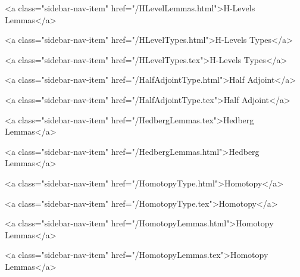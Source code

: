       
        
          <a class="sidebar-nav-item" href="/HLevelLemmas.html">H-Levels Lemmas</a>
        
      
    
      
        
          <a class="sidebar-nav-item" href="/HLevelTypes.html">H-Levels Types</a>
        
      
    
      
        
          <a class="sidebar-nav-item" href="/HLevelTypes.tex">H-Levels Types</a>
        
      
    
      
        
          <a class="sidebar-nav-item" href="/HalfAdjointType.html">Half Adjoint</a>
        
      
    
      
        
          <a class="sidebar-nav-item" href="/HalfAdjointType.tex">Half Adjoint</a>
        
      
    
      
        
          <a class="sidebar-nav-item" href="/HedbergLemmas.tex">Hedberg Lemmas</a>
        
      
    
      
        
          <a class="sidebar-nav-item" href="/HedbergLemmas.html">Hedberg Lemmas</a>
        
      
    
      
        
          <a class="sidebar-nav-item" href="/HomotopyType.html">Homotopy</a>
        
      
    
      
        
          <a class="sidebar-nav-item" href="/HomotopyType.tex">Homotopy</a>
        
      
    
      
        
          <a class="sidebar-nav-item" href="/HomotopyLemmas.html">Homotopy Lemmas</a>
        
      
    
      
        
          <a class="sidebar-nav-item" href="/HomotopyLemmas.tex">Homotopy Lemmas</a>
        
      
    
